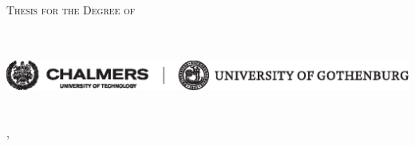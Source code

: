 
\begin{titlepage}
  \centering

  {\scshape Thesis for the Degree of \licdegree}\\[2cm]
%
  {\Huge \lictitle}\\[0.3cm]
  {\Large\itshape \licsubtitle}\\[2cm]
%
  {\LARGE\scshape \licauthor}

  \vfill

  \includegraphics[width=\textwidth]{img/LO_CH+GUeng_SV.eps}\\[0.5cm]

\licdepartment\\
\textsc{\licuniversity}\\
\liccity, \liccountry ~\licyear

\end{titlepage}

